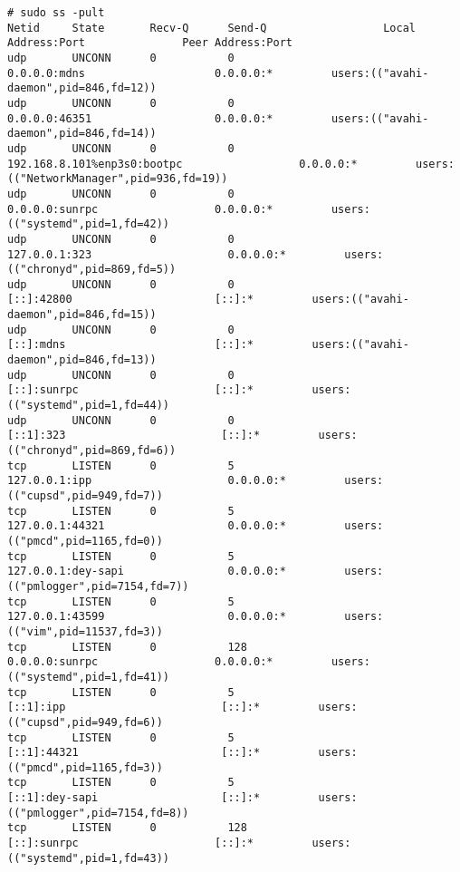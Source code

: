 \begin{verbatim}
# sudo ss -pult                               
Netid     State       Recv-Q      Send-Q                  Local Address:Port               Peer Address:Port                                                   
udp       UNCONN      0           0                             0.0.0.0:mdns                    0.0.0.0:*         users:(("avahi-daemon",pid=846,fd=12)) 
udp       UNCONN      0           0                             0.0.0.0:46351                   0.0.0.0:*         users:(("avahi-daemon",pid=846,fd=14))  
udp       UNCONN      0           0                192.168.8.101%enp3s0:bootpc                  0.0.0.0:*         users:(("NetworkManager",pid=936,fd=19))  
udp       UNCONN      0           0                             0.0.0.0:sunrpc                  0.0.0.0:*         users:(("systemd",pid=1,fd=42))  
udp       UNCONN      0           0                           127.0.0.1:323                     0.0.0.0:*         users:(("chronyd",pid=869,fd=5))  
udp       UNCONN      0           0                                [::]:42800                      [::]:*         users:(("avahi-daemon",pid=846,fd=15))  
udp       UNCONN      0           0                                [::]:mdns                       [::]:*         users:(("avahi-daemon",pid=846,fd=13))  
udp       UNCONN      0           0                                [::]:sunrpc                     [::]:*         users:(("systemd",pid=1,fd=44))  
udp       UNCONN      0           0                               [::1]:323                        [::]:*         users:(("chronyd",pid=869,fd=6))  
tcp       LISTEN      0           5                           127.0.0.1:ipp                     0.0.0.0:*         users:(("cupsd",pid=949,fd=7))  
tcp       LISTEN      0           5                           127.0.0.1:44321                   0.0.0.0:*         users:(("pmcd",pid=1165,fd=0))  
tcp       LISTEN      0           5                           127.0.0.1:dey-sapi                0.0.0.0:*         users:(("pmlogger",pid=7154,fd=7))  
tcp       LISTEN      0           5                           127.0.0.1:43599                   0.0.0.0:*         users:(("vim",pid=11537,fd=3))  
tcp       LISTEN      0           128                           0.0.0.0:sunrpc                  0.0.0.0:*         users:(("systemd",pid=1,fd=41))
tcp       LISTEN      0           5                               [::1]:ipp                        [::]:*         users:(("cupsd",pid=949,fd=6))  
tcp       LISTEN      0           5                               [::1]:44321                      [::]:*         users:(("pmcd",pid=1165,fd=3))  
tcp       LISTEN      0           5                               [::1]:dey-sapi                   [::]:*         users:(("pmlogger",pid=7154,fd=8))  
tcp       LISTEN      0           128                              [::]:sunrpc                     [::]:*         users:(("systemd",pid=1,fd=43))
\end{verbatim}


